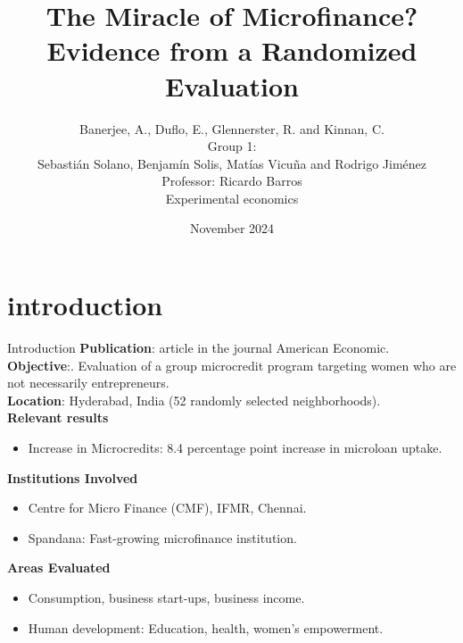 \documentclass[10pt]{beamer}
\title[The Miracle of Microfinance?]{The Miracle of Microfinance? Evidence from a Randomized Evaluation\\}
\author[Experimental Economics]{
{\small{Banerjee, A., Duflo, E., Glennerster, R. and Kinnan, C.}\\[0.6cm]}
Group 1:\\
Sebastián Solano, Benjamín Solis, Matías Vicuña and Rodrigo Jiménez\\[0.2cm]
\small{Professor: Ricardo Barros}\\
\small{Experimental economics}\\
}
\institute[\tiny{U. Javeriana}]{}
\date[\tiny{November 2024}]{\footnotesize{November 2024}}
\begin{document}

\begin{frame}[plain,t]
\titlepage
\end{frame}


\section{introduction}
\begin{frame}{Introduction}
\justifying
\textbf{Publication}: \cite{banerjee2015} article in the journal American Economic.\\
\vspace{\baselineskip}
\textbf{Objective}:. Evaluation of a group microcredit program targeting women who are not necessarily entrepreneurs.\\
\vspace{\baselineskip}
\textbf{Location}: Hyderabad, India (52 randomly selected neighborhoods).\\
\vspace{\baselineskip}
\textbf{Relevant results}
\begin{itemize}
    \justifying
    \item Increase in Microcredits: 8.4 percentage point increase in microloan uptake.
\end{itemize}
\textbf{Institutions Involved}
\begin{itemize}
    \item Centre for Micro Finance (CMF), IFMR, Chennai.\\
    \item Spandana: Fast-growing microfinance institution. 
\end{itemize}
\textbf{Areas Evaluated}
\begin{itemize}
\item Consumption, business start-ups, business income.\\
\item Human development: Education, health, women's empowerment.
\end{itemize}
\end{frame}
\end{document}
